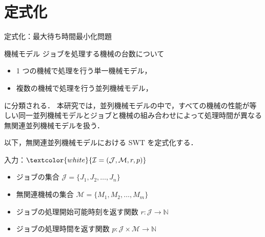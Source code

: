 \documentclass[dvipdfmx]{beamer}
\begin{document}
    \section{定式化}
    \begin{frame}{定式化：最大待ち時間最小化問題}
      \begin{block}{機械モデル}
        ジョブを処理する機械の台数について
        \begin{itemize}
          \item 1 つの機械で処理を行う\alert{単一機械モデル}，
          \item 複数の機械で処理を行う\alert{並列機械モデル}，
        \end{itemize}
        に分類される．
        本研究では，並列機械モデルの中で，すべての機械の性能が等しい\alert{同一並列機械モデル}とジョブと機械の組み合わせによって処理時間が異なる\alert{無関連並列機械モデル}を扱う．
      \end{block}

      以下，無関連並列機械モデルにおける SWT を定式化する．
      \begin{block}{入力：$\textcolor{white}{\mathcal{I} = (\mathcal{J}, \mathcal{M}, r, p)}$}
        \begin{itemize}
          \item {ジョブの集合 $\mathcal{J} = \{J_1,J_2,\ldots,J_n\}$}
          \item {無関連機械の集合 $\mathcal{M} = \{M_1,M_2,\ldots,M_m\}$}
          \item {ジョブの処理開始可能時刻を返す関数 $r : \mathcal{J} \to \mathbb{N}$}
          \item {ジョブの処理時間を返す関数 $p : \mathcal{J} \times \mathcal{M} \to \mathbb{N}$}
        \end{itemize}
      \end{block}
    \end{frame}
\end{document}
